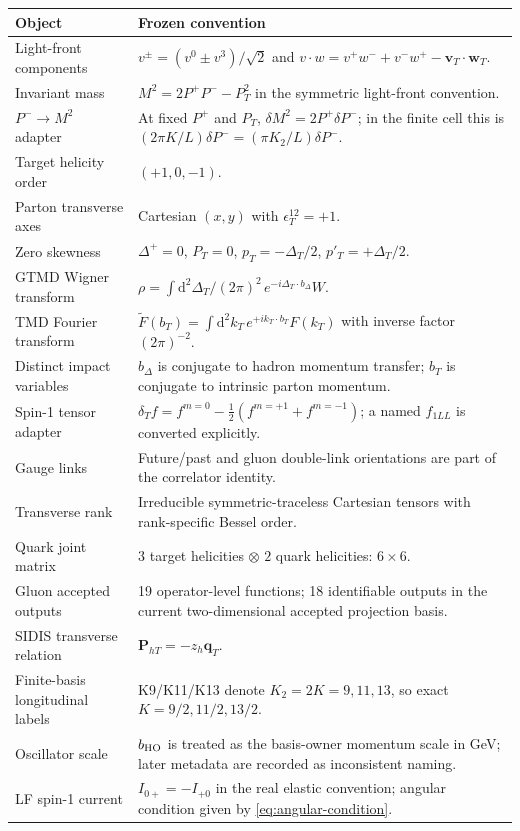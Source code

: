 \documentclass[11pt,oneside]{book}
\newcommand{\dd}{\mathrm{d}}
\newcommand{\statuscode}[1]{\text{\ttfamily\detokenize{#1}}}
\begin{document}
\begin{longtable}{p{}p{}}
\toprule
\textbf{Object}&\textbf{Frozen convention}\\
\midrule
Light-front components&$v^{\pm}=(v^0\pm v^3)/\sqrt2$ and $v\cdot w=v^+w^-+v^-w^+-\bm v_T\cdot\bm w_T$.\\
Invariant mass&$M^2=2P^+P^- -P_T^2$ in the symmetric light-front convention.\\
$P^-\to M^2$ adapter&At fixed $P^+$ and $P_T$, $\delta M^2=2P^+\delta P^-$; in the finite cell this is $(2\pi K/L)\delta P^-=(\pi K_2/L)\delta P^-$.\\
Target helicity order&$(+1,0,-1)$.\\
Parton transverse axes&Cartesian $(x,y)$ with $\epsilon_T^{12}=+1$.\\
Zero skewness&$\Delta^+=0$, $P_T=0$, $p_T=-\Delta_T/2$, $p'_T=+\Delta_T/2$.\\
GTMD Wigner transform&$\rho=\int \dd^2\Delta_T/(2\pi)^2\,e^{-i\Delta_T\cdot b_\Delta}W$.\\
TMD Fourier transform&$\widetilde F(b_T)=\int\dd^2k_T\,e^{+ik_T\cdot b_T}F(k_T)$ with inverse factor $(2\pi)^{-2}$.\\
Distinct impact variables&$b_\Delta$ is conjugate to hadron momentum transfer; $b_T$ is conjugate to intrinsic parton momentum.\\
Spin-1 tensor adapter&$\delta_T f=f^{m=0}-\tfrac12(f^{m=+1}+f^{m=-1})$; a named $f_{1LL}$ is converted explicitly.\\
Gauge links&Future/past and gluon double-link orientations are part of the correlator identity.\\
Transverse rank&Irreducible symmetric-traceless Cartesian tensors with rank-specific Bessel order.\\
Quark joint matrix&$3$ target helicities $\otimes$ $2$ quark helicities: $6\times6$.\\
Gluon accepted outputs&19 operator-level functions; 18 identifiable outputs in the current two-dimensional accepted projection basis.\\
SIDIS transverse relation&$\bm P_{hT}=-z_h\bm q_T$.\\
Finite-basis longitudinal labels&K9/K11/K13 denote $K_2=2K=9,11,13$, so exact $K=9/2,11/2,13/2$.\\
Oscillator scale&$b_{\rm HO}$ is treated as the basis-owner momentum scale in GeV; later \statuscode{bHO_GeVinv} metadata are recorded as inconsistent naming.\\
LF spin-1 current&$I_{0+}=-I_{+0}$ in the real elastic convention; angular condition given by \cref{eq:angular-condition}.\\

\end{longtable}
\end{document}
